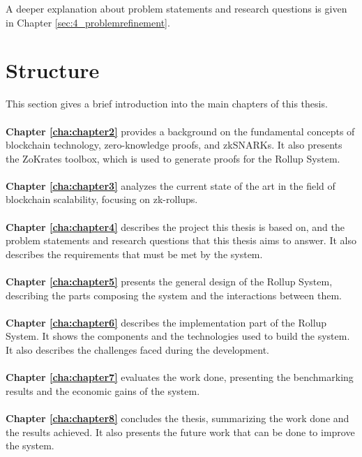 A deeper explanation about problem statements and research questions is given in Chapter \ref{sec:4_problemrefinement}.

\section{Structure\label{sec:structure}}

This section gives a brief introduction into the main chapters of this thesis.
\\
\\
\textbf{Chapter \ref{cha:chapter2}} provides a background on the fundamental concepts of blockchain technology, zero-knowledge proofs, and zkSNARKs. It also presents the ZoKrates toolbox, which is used to generate proofs for the Rollup System.
\\
\\
\textbf{Chapter \ref{cha:chapter3}} analyzes the current state of the art in the field of blockchain scalability, focusing on zk-rollups.
\\
\\
\textbf{Chapter \ref{cha:chapter4}} describes the project this thesis is based on, and the problem statements and research questions that this thesis aims to answer. It also describes the requirements that must be met by the system.
\\
\\
\textbf{Chapter \ref{cha:chapter5}} presents the general design of the Rollup System, describing the parts composing the system and the interactions between them.
\\
\\
\textbf{Chapter \ref{cha:chapter6}} describes the implementation part of the Rollup System. It shows the components and the technologies used to build the system. It also describes the challenges faced during the development.
\\
\\
\textbf{Chapter \ref{cha:chapter7}} evaluates the work done, presenting the benchmarking results and the economic gains of the system.
\\
\\
\textbf{Chapter \ref{cha:chapter8}} concludes the thesis, summarizing the work done and the results achieved. It also presents the future work that can be done to improve the system.
